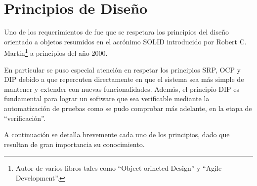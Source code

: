 \section{Principios de Diseño}
\par Uno de los requerimientos de \remo fue que se respetara los principios del diseño orientado a objetos resumidos en el acrónimo SOLID\cite{Martin00} introducido por Robert C. Martin\footnote{Autor de varios libros tales como ``Object-orineted Design'' y ``Agile Development''.} a principios del año 2000.

\par En particular se puso especial atención en respetar los principios SRP, OCP y DIP debido a que repercuten directamente en que el sistema sea más simple de mantener y extender con nuevas funcionalidades. Además, el principio DIP es fundamental para lograr un software que sea verificable mediante la automatización de pruebas como se pudo comprobar más adelante, en la etapa de “verificación”.

A continuación se detalla brevemente cada uno de los principios, dado que resultan de gran importancia su conocimiento.

